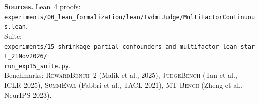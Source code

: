 \documentclass[11pt]{article}
\begin{document}
{\footnotesize\noindent\textbf{Sources.} Lean~4 proofs: \texttt{experiments/00\_lean\_formalization/lean/TvdmiJudge/MultiFactorContinuous.lean}.\\
Suite: \texttt{experiments/15\_shrinkage\_partial\_confounders\_and\_multifactor\_lean\_start\_21Nov2026/}\\
\texttt{run\_exp15\_suite.py}.\\
Benchmarks: \textsc{RewardBench~2} (Malik et al., 2025), \textsc{JudgeBench} (Tan et al., ICLR 2025), \textsc{SummEval} (Fabbri et al., TACL 2021), \textsc{MT-Bench} (Zheng et al., NeurIPS 2023).}
\end{document}
